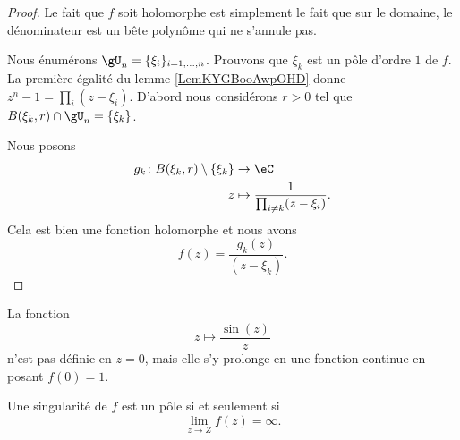 \begin{proof}
	Le fait que \( f\) soit holomorphe est simplement le fait que sur le domaine, le dénominateur est un bête polynôme qui ne s'annule pas.

	Nous énumérons \( \gU_n = \{ \xi_i \}_{i=1,\ldots, n}\). Prouvons que \( \xi_k\) est un pôle d'ordre \( 1\) de \( f\). La première égalité du lemme \ref{LemKYGBooAwpOHD} donne \( z^n-1=\prod_i(z-\xi_i)\). D'abord nous considérons \( r>0\) tel que \( B(\xi_k,r)\cap \gU_n=\{ \xi_k \}\).

	Nous posons
	\begin{equation}
		\begin{aligned}
			g_k\colon B(\xi_k,r)\setminus\{ \xi_k \} & \to \eC                                       \\
			z                                        & \mapsto \frac{1}{ \prod_{i\neq k}(z-\xi_i) }.
		\end{aligned}
	\end{equation}
	Cela est bien une fonction holomorphe et nous avons
	\begin{equation}
		f(z)=\frac{ g_k(z) }{ (z-\xi_k) }.
	\end{equation}
\end{proof}

\begin{example}
	La fonction
	\begin{equation}
		z\mapsto \frac{ \sin(z) }{ z }
	\end{equation}
	n'est pas définie en \( z=0\), mais elle s'y prolonge en une fonction continue en posant \( f(0)=1\).
\end{example}

\begin{proposition}
	Une singularité de \( f\) est un pôle si et seulement si
	\begin{equation}
		\lim_{z\to Z}f(z)=\infty.
	\end{equation}
\end{proposition}

